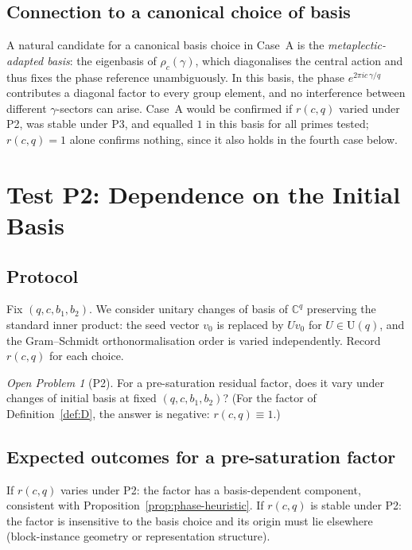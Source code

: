 \documentclass[11pt,a4paper]{article}
\theoremstyle{remark}
\newtheorem{openproblem}[theorem]{Open Problem}
\newcommand{\rcq}{r(c,q)}
\begin{document}
  \subsection{Connection to a canonical choice of basis}
    \label{subsec:meta-basis}

    A natural candidate for a canonical basis choice in Case~A is the
    \emph{metaplectic-adapted basis}: the eigenbasis of $\rho_{c}(\gamma)$,
    which diagonalises the central action and thus fixes the phase reference
    unambiguously.
    In this basis, the phase $e^{2\pi i c\,\gamma/q}$ contributes a diagonal
    factor to every group element, and no interference between different
    $\gamma$-sectors can arise.
    Case~A would be confirmed if $\rcq$ varied under P2, was stable under P3, and equalled $1$ in this basis for all
    primes tested; $\rcq = 1$ alone confirms nothing, since it also holds in the fourth case
    below.

  \section{Test P2: Dependence on the Initial Basis}
  \label{sec:testP2}

  \subsection{Protocol}

    Fix $(q, c, b_{1}, b_{2})$.
    We consider unitary changes of basis of $\mathbb{C}^{q}$ preserving the standard inner
    product: the seed vector $v_{0}$ is replaced by $U v_{0}$ for $U \in \mathrm{U}(q)$,
    and the Gram--Schmidt orthonormalisation order is varied independently.
    Record $\rcq$ for each choice.

    \begin{openproblem}[P2]
      \label{op:P2}
      For a pre-saturation residual factor, does it vary under changes of initial basis at fixed
      $(q, c, b_{1}, b_{2})$?
      (For the factor of Definition~\ref{def:D}, the answer is negative: $\rcq \equiv 1$.)
    \end{openproblem}

  \subsection{Expected outcomes for a pre-saturation factor}

    If $\rcq$ varies under P2: the factor has a basis-dependent component,
    consistent with Proposition~\ref{prop:phase-heuristic}.
    If $\rcq$ is stable under P2: the factor is insensitive to the basis choice
    and its origin must lie elsewhere (block-instance geometry or representation
    structure).
\end{document}
